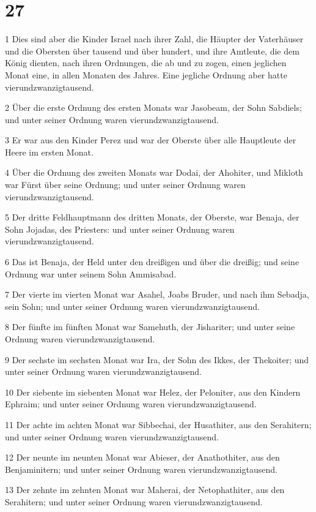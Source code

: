 \chapter{27}

\par 1 Dies sind aber die Kinder Israel nach ihrer Zahl, die Häupter der Vaterhäuser und die Obersten über tausend und über hundert, und ihre Amtleute, die dem König dienten, nach ihren Ordnungen, die ab und zu zogen, einen jeglichen Monat eine, in allen Monaten des Jahres. Eine jegliche Ordnung aber hatte vierundzwanzigtausend.
\par 2 Über die erste Ordnung des ersten Monats war Jasobeam, der Sohn Sabdiels; und unter seiner Ordnung waren vierundzwanzigtausend.
\par 3 Er war aus den Kinder Perez und war der Oberste über alle Hauptleute der Heere im ersten Monat.
\par 4 Über die Ordnung des zweiten Monats war Dodai, der Ahohiter, und Mikloth war Fürst über seine Ordnung; und unter seiner Ordnung waren vierundzwanzigtausend.
\par 5 Der dritte Feldhauptmann des dritten Monats, der Oberste, war Benaja, der Sohn Jojadas, des Priesters: und unter seiner Ordnung waren vierundzwanzigtausend.
\par 6 Das ist Benaja, der Held unter den dreißigen und über die dreißig; und seine Ordnung war unter seinem Sohn Ammisabad.
\par 7 Der vierte im vierten Monat war Asahel, Joabs Bruder, und nach ihm Sebadja, sein Sohn; und unter seiner Ordnung waren vierundzwanzigtausend.
\par 8 Der fünfte im fünften Monat war Samehuth, der Jishariter; und unter seine Ordnung waren vierundzwanzigtausend.
\par 9 Der sechste im sechsten Monat war Ira, der Sohn des Ikkes, der Thekoiter; und unter seiner Ordnung waren vierundzwanzigtausend.
\par 10 Der siebente im siebenten Monat war Helez, der Peloniter, aus den Kindern Ephraim; und unter seiner Ordnung waren vierundzwanzigtausend.
\par 11 Der achte im achten Monat war Sibbechai, der Husathiter, aus den Serahitern; und unter seiner Ordnung waren vierundzwanzigtausend.
\par 12 Der neunte im neunten Monat war Abieser, der Anathothiter, aus den Benjaminitern; und unter seiner Ordnung waren vierundzwanzigtausend.
\par 13 Der zehnte im zehnten Monat war Maherai, der Netophathiter, aus den Serahitern; und unter seiner Ordnung waren vierundzwanzigtausend.

